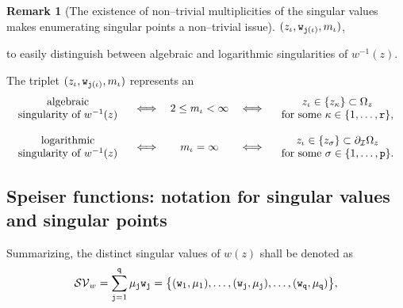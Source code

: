 \documentclass[final,3p,times]{elsarticle}
\theoremstyle{definition}
\newtheorem{remark}[theorem]{Remark}
\begin{document}
\begin{remark}[The existence of non--trivial multiplicities of the singular values 
makes enumerating singular points a non--trivial issue]
\centerline{
$( z_\iota ,  {\tt w}_{{\tt j}(\iota)} , m_{\iota} )$,
}

\noindent
to easily distinguish between algebraic and logarithmic singularities of $w^{-1}(z)$.



\noindent
The triplet $(z_\iota, {\tt w}_{{\tt j}(\iota)}, m_{\iota})$ represents an
%
\begin{equation}
\label{eq:multiplicities-of-branch-points}
\begin{array}{rcccl}
\begin{array}{c}
\text{algebraic}
\\
\text{singularity of $w^{-1}(z)$}  
\end{array} 
 &  \iff  &
2\leq m_{\iota}<\infty 
& \iff & 
\begin{array}{c}
z_\iota \in \{ z_\kappa\} \subset \Omega_z
\\
\text{for some } \kappa \in \{ 1,\ldots,{\tt r}\},
\end{array}
\\
&&&&
\\
\begin{array}{c}
\text{logarithmic}
\\
\text{singularity of $w^{-1}(z)$}  
\end{array}
 &   \iff &  
m_{\iota}=\infty
& \iff &  
\begin{array}{c} 
z_\iota \in \{  z_\sigma \} \subset \partial_{\mathcal{I}}\Omega_z
\\ 
\text{for some }\sigma \in \{ 1,\ldots,{\tt p}\}.
\end{array}
\end{array}
\end{equation}

\end{remark}




\subsection{Speiser functions: notation for singular values and singular points}
Summarizing, 
the distinct singular values of $w(z)$ 
shall be denoted as
\begin{equation}
\label{eq:singular-values-details}
\mathcal{SV}_w=
\sum\limits_{{\tt j}=1}^{{\tt q}} \mu_{\tt j} {\tt w}_{\tt j} =
\big \{
({\tt w}_1, \mu_1 ), \ldots , 
({\tt w}_{\tt j} ,\mu_{\tt j} ), \ldots, 
({\tt w}_{\tt q}, \mu_{\tt q} )
\big \},
\end{equation}
\end{document}
